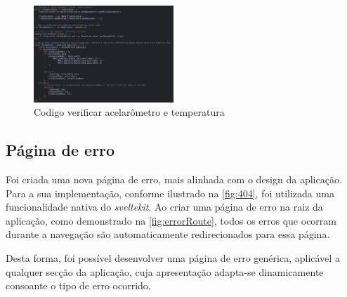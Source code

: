 \begin{figure}[!h]
	\centering
	\includegraphics[width=0.47\textwidth]{figs/echartData.png}
	\caption{Codigo verificar acelarômetro e temperatura}
	\label{fig:selectAccAndTemp}
\end{figure}

\clearpage
\subsection{Página de erro} %
Foi criada uma nova página de erro, mais alinhada com o design da aplicação. Para a sua implementação, conforme ilustrado na \autoref{fig:404}, foi utilizada uma funcionalidade nativa do \textit{sveltekit}. Ao criar uma página de erro na raiz da aplicação, como demonstrado na \autoref{fig:errorRoute}, todos os erros que ocorram durante a navegação são automaticamente redirecionados para essa página.

Desta forma, foi possível desenvolver uma página de erro genérica, aplicável a qualquer secção da aplicação, cuja apresentação adapta-se dinamicamente consoante o tipo de erro ocorrido.

